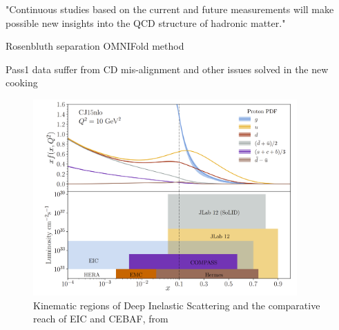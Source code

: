  "Continuous
studies based on the current and future measurements will make possible new insights
into the QCD structure of hadronic matter."

Rosenbluth separation
OMNIFold method

Pass1 data suffer from CD mis-alignment and other issues solved in the new cooking

\begin{figure}
    \centering
    \includegraphics[width=0.9\textwidth]{Chapters/Ch5-Further/X_conclusion/pics/future.png}
    \caption{Kinematic regions of Deep Inelastic Scattering and the comparative reach of EIC and CEBAF, from \parencite{Arrington2022PhysicsOpportunities} }
    \label{fig:physics_future_ranges}
\end{figure}
